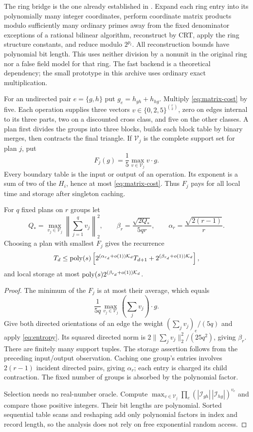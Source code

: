 The ring bridge is the one already established in \cite{tree,portfolio}.
Expand each ring entry into its polynomially many integer coordinates,
perform coordinate matrix products modulo sufficiently many ordinary primes
away from the fixed denominator exceptions of a rational bilinear algorithm,
reconstruct by CRT, apply the ring structure constants, and reduce modulo
$2^{p_t}$. All reconstruction bounds have polynomial bit length. This uses
neither division by a nonunit in the original ring nor a false field model
for that ring. The fast backend is a theoretical dependency; the small
prototype in this archive uses ordinary exact multiplication.

For an undirected pair $e=\{g,h\}$ put $g_e=h_{gh}+h_{hg}$. Multiply
\eqref{eq:matrix-cost} by five. Each operation supplies three vectors
$v\in\{0,2,5\}^{\binom r2}$, zero on edges internal to its three
parts, two on a discounted cross class, and five on the other classes.
A plan first divides the groups into three blocks, builds each block table
by binary merges, then contracts the final triangle. If $\mathcal V_j$ is
the complete support set for plan $j$, put
\[
 F_j(g)=\frac15\max_{v\in\mathcal V_j}v\cdot g.
\]
Every boundary table is the input or output of an operation. Its exponent
is a sum of two of the $H_i$, hence at most \eqref{eq:matrix-cost}.
Thus $F_j$ pays for all local time and storage after singleton caching.

\begin{lemma}\label{lem:certificate}
For $q$ fixed plans on $r$ groups let
\[
 Q_* =\max_{v_j\in\mathcal V_j}\left\|\sum_{j=1}^qv_j\right\|_2^2,
 \qquad \beta_r=\frac{\sqrt{2Q_*}}{5qr},\qquad
 \alpha_r=\frac{\sqrt{2(r-1)}}r.
\]
Choosing a plan with smallest $F_j$ gives the recurrence
\begin{equation}\label{eq:paid-recurrence}
 T_d\le\operatorname{poly}(s)\left[
 2^{(\alpha_{r_d}+o(1))\mathcal K_d}T_{d+1}
 +2^{(\beta_{r_d}+o(1))\mathcal K_d}\right],
\end{equation}
and local storage at most $\operatorname{poly}(s)2^{(\beta_{r_d}+o(1))\mathcal K_d}$.
\end{lemma}
\begin{proof}
The minimum of the $F_j$ is at most their average, which equals
\[
 \frac1{5q}\max_{v_j\in\mathcal V_j}
 \left(\sum_jv_j\right)\cdot g.
\]
Give both directed orientations of an edge the weight
$(\sum_jv_j)_e/(5q)$ and apply \eqref{eq:entropy}. Its squared directed
norm is $2\|\sum_jv_j\|_2^2/(25q^2)$, giving $\beta_r$.
There are finitely many support tuples. The storage assertion follows
from the preceding input/output observation. Caching one group's entries
involves $2(r-1)$ incident directed pairs, giving $\alpha_r$; each entry
is charged its child contraction. The fixed number of groups is absorbed
by the polynomial factor.

Selection needs no real-number oracle. Compute
$\max_{v\in\mathcal V_j}\prod_e
(|\mathcal I_{gh}|\,|\mathcal I_{hg}|)^{v_e}$ and compare those
positive integers. Their bit lengths are polynomial. Sorted sequential
table scans and reshaping add only polynomial factors in index and record
length, so the analysis does not rely on free exponential random access.
\end{proof}
